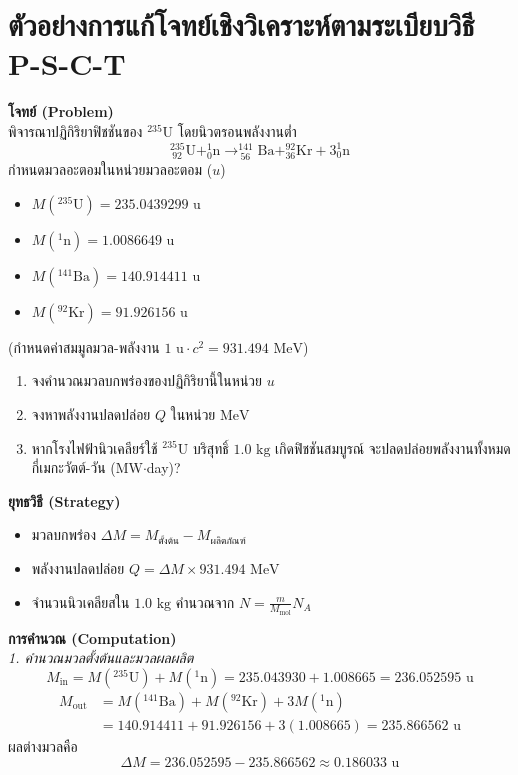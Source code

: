 \section{ตัวอย่างการแก้โจทย์เชิงวิเคราะห์ตามระเบียบวิธี P-S-C-T}

\begin{psctexample}
\textbf{โจทย์ (Problem)} \\
พิจารณาปฏิกิริยาฟิชชันของ $^{235}\text{U}$ โดยนิวตรอนพลังงานต่ำ
\begin{equation}
^{235}_{\ 92}\text{U} + ^1_0\text{n} \to ^{141}_{\ 56}\text{Ba} + ^{92}_{36}\text{Kr} + 3 ^1_0\text{n}
\end{equation}
กำหนดมวลอะตอมในหน่วยมวลอะตอม ($u$)
\begin{itemize}
    \item $M(^{235}\text{U}) = 235.0439299\text{ u}$
    \item $M(^1\text{n}) = 1.0086649\text{ u}$
    \item $M(^{141}\text{Ba}) = 140.914411\text{ u}$
    \item $M(^{92}\text{Kr}) = 91.926156\text{ u}$
\end{itemize}
(กำหนดค่าสมมูลมวล-พลังงาน $1\text{ u} \cdot c^2 = 931.494\text{ MeV}$)
\begin{enumerate}
    \item จงคำนวณมวลบกพร่องของปฏิกิริยานี้ในหน่วย $u$
    \item จงหาพลังงานปลดปล่อย $Q$ ในหน่วย $\text{MeV}$
    \item หากโรงไฟฟ้านิวเคลียร์ใช้ $^{235}\text{U}$ บริสุทธิ์ $1.0\text{ kg}$ เกิดฟิชชันสมบูรณ์ จะปลดปล่อยพลังงานทั้งหมดกี่เมกะวัตต์-วัน (MW$\cdot$day)?
\end{enumerate}

\textbf{ยุทธวิธี (Strategy)} \\
\begin{itemize}
    \item มวลบกพร่อง $\Delta M = M_{\text{ตั้งต้น}} - M_{\text{ผลิตภัณฑ์}}$
    \item พลังงานปลดปล่อย $Q = \Delta M \times 931.494\text{ MeV}$
    \item จำนวนนิวเคลียสใน $1.0\text{ kg}$ คำนวณจาก $N = \frac{m}{M_{\text{mol}}} N_A$
\end{itemize}

\textbf{การคำนวณ (Computation)} \\
\textit{1. คำนวณมวลตั้งต้นและมวลผลผลิต}
\begin{equation}
M_{\text{in}} = M(^{235}\text{U}) + M(^1\text{n}) = 235.043930 + 1.008665 = 236.052595\text{ u}
\end{equation}
\begin{align}
M_{\text{out}} &= M(^{141}\text{Ba}) + M(^{92}\text{Kr}) + 3 M(^1\text{n}) \nonumber \\
&= 140.914411 + 91.926156 + 3(1.008665) = 235.866562\text{ u}
\end{align}
ผลต่างมวลคือ
\begin{equation}
\Delta M = 236.052595 - 235.866562 \approx 0.186033\text{ u}
\end{equation}


\end{psctexample}

